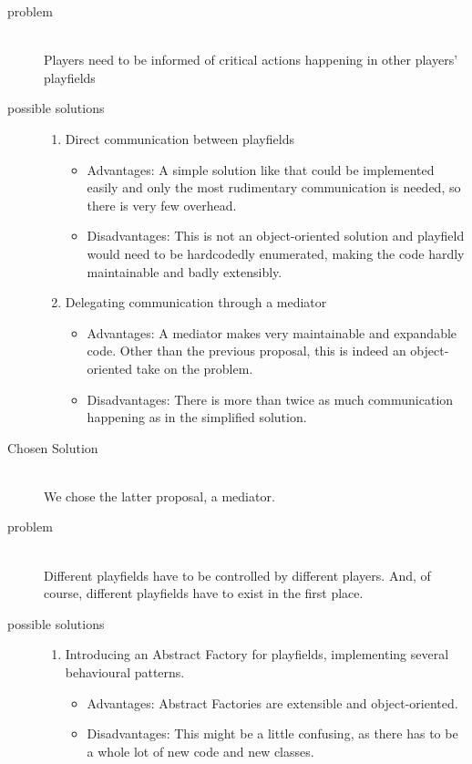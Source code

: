 \begin{description}
%
  \item[problem] ~\\ \hfill
    Players need to be informed of critical actions happening in other players' playfields 
  \item[possible solutions] \hfill

    \begin{enumerate}
      \item Direct communication between playfields
      \begin{itemize}
        \item Advantages: A simple solution like that could be implemented easily and only the most rudimentary communication is needed, so there is  very few overhead.
        \item Disadvantages: This is not an object-oriented solution and playfield would need to be hardcodedly enumerated, making the code hardly maintainable and badly extensibly. 
      \end{itemize}

      \item Delegating communication through a mediator
      \begin{itemize}
        \item Advantages: A mediator makes very maintainable and expandable code. Other than the previous proposal, this is indeed an object-oriented take on the problem.
        \item Disadvantages: There is more than twice as much communication happening as in the simplified solution.
      \end{itemize}
    \end{enumerate}

  \item[Chosen Solution] ~\\ \hfill
    We chose the latter proposal, a mediator.
  \\

  \item[problem] ~\\ \hfill
    Different playfields have to be controlled by different players. And, of course, different playfields have to exist in the first place.
  \item[possible solutions] \hfill

    \begin{enumerate}
      \item Introducing an Abstract Factory for playfields, implementing several behavioural patterns.
      \begin{itemize}
        \item Advantages: Abstract Factories are extensible and object-oriented.
        \item Disadvantages: This might be a little confusing, as there has to be a whole lot of new code and new classes.
      \end{itemize}


\end{enumerate}
\end{description}
